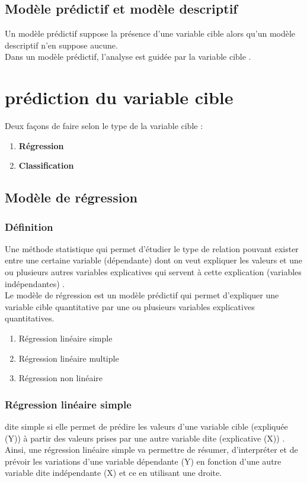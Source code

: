 \documentclass[12pt]{report}
\begin{document}
\subsection{Modèle prédictif et modèle descriptif}
Un modèle prédictif suppose la présence d'une variable cible alors qu'un modèle descriptif n'en suppose aucune.\\
Dans un modèle prédictif, l'analyse est guidée par la variable cible \cite{ref11}. 

\section{prédiction du variable cible}
Deux façons de faire selon le type de la variable cible :
\begin{enumerate}
\item \textbf{Régression}
\item \textbf{Classification} 

\end{enumerate}

\subsection{Modèle de régression}

\subsubsection{Définition}
Une méthode statistique qui permet d'étudier le type de relation pouvant exister entre une certaine variable (dépendante) dont on veut expliquer les valeurs et une ou plusieurs autres variables explicatives qui servent à cette explication (variables indépendantes) \cite{ref11} . \\
Le modèle de régression est un modèle prédictif qui permet d'expliquer une variable cible quantitative par une ou plusieurs variables explicatives quantitatives.





\begin{enumerate}
\item Régression linéaire simple

\item Régression linéaire multiple

\item Régression non linéaire
\end{enumerate}


\subsubsection{Régression linéaire simple}
dite simple si elle permet de prédire les valeurs d’une variable cible (expliquée (Y)) à partir des valeurs prises par une autre variable dite (explicative (X)) \cite{ref11} . \\
Ainsi, une régression linéaire simple va permettre de résumer, d’interpréter et de prévoir les variations d’une variable dépendante (Y) en fonction d’une autre variable dite indépendante (X) et ce en utilisant une droite.
\end{document}
